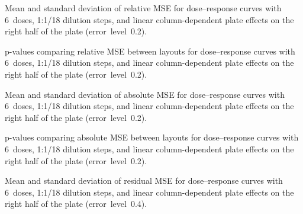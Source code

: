 \begin{table}[p]
    \centering
    \small
    
    \caption{Mean and standard deviation of relative \ECIC{} MSE for dose--response curves with 6~doses, 1:1/18 dilution steps, and linear column-dependent plate effects on the right half of the plate (error~level~0.2).}
    \label{tab:dr-relic50-mean-std-6doses-dil18-half-columns-neg-controls-0.2}
\end{table}

\begin{table}[p]
    \centering
    \small
    
    \caption{p-values comparing relative \ECIC{} MSE between layouts for dose--response curves with 6~doses, 1:1/18 dilution steps, and linear column-dependent plate effects on the right half of the plate (error~level~0.2).}
    \label{tab:dr-relic50-pvalues-6doses-dil18-half-columns-neg-controls-0.2}
\end{table}

\begin{table}[p]
    \centering
    \small
    
    \caption{Mean and standard deviation of absolute \ECIC{} MSE for dose--response curves with 6~doses, 1:1/18 dilution steps, and linear column-dependent plate effects on the right half of the plate (error~level~0.2).}
    \label{tab:dr-absic50-mean-std-6doses-dil18-half-columns-neg-controls-0.2}
\end{table}

\begin{table}[p]
    \centering
    \small
    
    \caption{p-values comparing absolute \ECIC{} MSE between layouts for dose--response curves with 6~doses, 1:1/18 dilution steps, and linear column-dependent plate effects on the right half of the plate (error~level~0.2).}
    \label{tab:dr-absic50-pvalues-6doses-dil18-half-columns-neg-controls-0.2}
\end{table}

\begin{table}[p]
    \centering
    \small
    
    \caption{Mean and standard deviation of residual MSE for dose--response curves with 6~doses, 1:1/18 dilution steps, and linear column-dependent plate effects on the right half of the plate (error~level~0.4).}
    \label{tab:dr-residuals-mean-std-6doses-dil18-half-columns-neg-controls-0.4}
\end{table}

